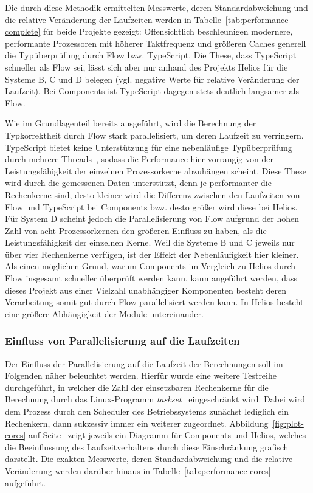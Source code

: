 Die durch diese Methodik ermittelten Messwerte, deren Standardabweichung und die relative Veränderung der Laufzeiten werden in Tabelle~\ref{tab:performance-complete} für beide Projekte gezeigt: Offensichtlich beschleunigen modernere, performante Prozessoren mit höherer Taktfrequenz und größeren Caches generell die Typüberprüfung durch Flow bzw. TypeScript. Die These, dass TypeScript schneller als Flow sei, lässt sich aber nur anhand des Projekts Helios für die Systeme B, C und D belegen (vgl. negative Werte für relative Veränderung der Laufzeit). Bei Components ist TypeScript dagegen stets deutlich langsamer als Flow.

\tablespace


Wie im Grundlagenteil bereits ausgeführt, wird die Berechnung der Typkorrektheit durch Flow stark parallelisiert, um deren Laufzeit zu verringern. TypeScript bietet keine Unterstützung für eine nebenläufige Typüberprüfung durch mehrere Threads~\autocite{TS:NO_MULTICORE}, sodass die Performance hier vorrangig von der Leistungsfähigkeit der einzelnen Prozessorkerne abzuhängen scheint. Diese These wird durch die gemessenen Daten unterstützt, denn je performanter die Rechenkerne sind, desto kleiner wird die Differenz zwischen den Laufzeiten von Flow und TypeScript bei Components bzw. desto größer wird diese bei Helios.
Für System D scheint jedoch die Parallelisierung von Flow aufgrund der hohen Zahl von acht Prozessorkernen den größeren Einfluss zu haben, als die Leistungsfähigkeit der einzelnen Kerne. Weil die Systeme B und C jeweils nur über vier Rechenkerne verfügen, ist der Effekt der Nebenläufigkeit hier kleiner. Als einen möglichen Grund, warum Components im Vergleich zu Helios durch Flow insgesamt schneller überprüft werden kann, kann angeführt werden, dass dieses Projekt aus einer Vielzahl unabhängiger Komponenten besteht deren Verarbeitung somit gut durch Flow parallelisiert werden kann. In Helios besteht eine größere Abhängigkeit der Module untereinander.

\subsubsection{Einfluss von Parallelisierung auf die Laufzeiten}

Der Einfluss der Parallelisierung auf die Laufzeit der Berechnungen soll im Folgenden näher beleuchtet werden. Hierfür wurde eine weitere Testreihe durchgeführt, in welcher die Zahl der einsetzbaren Rechenkerne für die Berechnung durch das Linux-Programm \textit{taskset}~\autocite{TASKSET} eingeschränkt wird. Dabei wird dem Prozess durch den Scheduler des Betriebssystems zunächst lediglich ein Rechenkern, dann sukzessiv immer ein weiterer zugeordnet. Abbildung~\ref{fig:plot-cores} auf Seite~\pageref{fig:plot-cores} zeigt jeweils ein Diagramm für Components und Helios, welches die Beeinflussung des Laufzeitverhaltens durch diese Einschränkung grafisch darstellt. Die exakten Messwerte, deren Standardabweichung und die relative Veränderung werden darüber hinaus in Tabelle~\ref{tab:performance-cores} aufgeführt.

